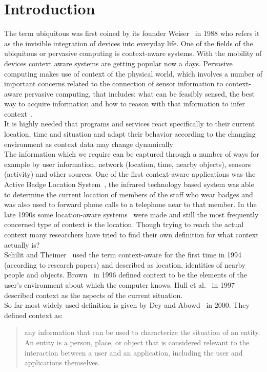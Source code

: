 \documentclass[copyright,creativecommons,noderivs,noncommercial]{eptcs}
\begin{document}
\section{Introduction}
The term ubiquitous was first coined by its founder Weiser~\cite{k19} in 1988 who refers it as the invisible integration of devices into everyday life. One of the fields of the ubiquitous or pervasive computing is context-aware systems. With the mobility of devices context aware systems are getting popular now a days. Pervasive computing makes use of context of the physical world, which involves a number of important concerns related to the connection of sensor information to context-aware pervasive computing, that includes: what can be feasibly sensed, the best way to acquire information and how to reason with that information to infer context~\cite{k18}.\\
It is highly needed that programs and services react specifically to their current location, time and situation and adapt their behavior according to the changing environment as context data may change dynamically~\cite{k3}\\
The information which we require can be captured through a number of ways for example by user information, network (location, time, nearby objects), sensors (activity) and other sources. One of the first context-aware applications was the Active Badge Location System~\cite{k26}, the infrared technology based system was able to determine the current location of members of the staff who wear badges and was also used to forward phone calls to a telephone near to that member. In the late 1990s some location-aware systems~\cite{k2,k7} were made and still the most frequently concerned type of context is the location. Though trying to reach the actual context many researchers have tried to find their own definition for what context actually is?\\
Schilit and Theimer~\cite{k23} used the term context-aware for the first time in 1994 (according to research papers) and described as location, identities of nearby people and objects. Brown~\cite{k5} in 1996 defined context to be the elements of the user's environment about which the computer knows. Hull et al.~\cite{k17} in 1997 described context as the aspects of the current situation.\\
So far most widely used definition is given by Dey and Abowd~\cite{k9} in 2000. They defined context as:\begin{quote}{any information that can be used to characterize the situation of an entity. An entity is a person, place, or object that is considered relevant to the interaction between a user and an application, including the user and applications themselves.}\end{quote}
\end{document}
